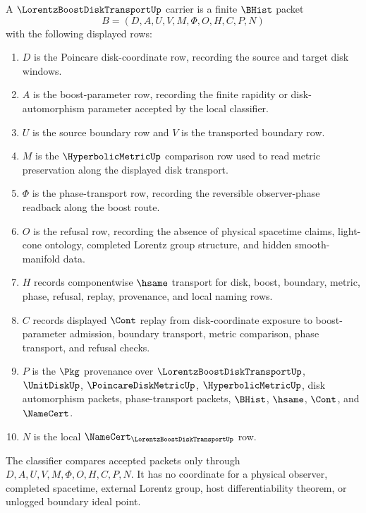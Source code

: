 \begin{definition}
\label{def:lorentz-boost-disk-transport-carrier}
A $\LorentzBoostDiskTransportUp$ carrier is a finite $\BHist$ packet
$$
B=(D,A,U,V,M,\Phi,O,H,C,P,N)
$$
with the following displayed rows:
\begin{enumerate}
\item $D$ is the Poincare disk-coordinate row, recording the source and target disk windows.
\item $A$ is the boost-parameter row, recording the finite rapidity or disk-automorphism parameter accepted by the local classifier.
\item $U$ is the source boundary row and $V$ is the transported boundary row.
\item $M$ is the $\HyperbolicMetricUp$ comparison row used to read metric preservation along the displayed disk transport.
\item $\Phi$ is the phase-transport row, recording the reversible observer-phase readback along the boost route.
\item $O$ is the refusal row, recording the absence of physical spacetime claims, light-cone ontology, completed Lorentz group structure, and hidden smooth-manifold data.
\item $H$ records componentwise $\hsame$ transport for disk, boost, boundary, metric, phase, refusal, replay, provenance, and local naming rows.
\item $C$ records displayed $\Cont$ replay from disk-coordinate exposure to boost-parameter admission, boundary transport, metric comparison, phase transport, and refusal checks.
\item $P$ is the $\Pkg$ provenance over $\LorentzBoostDiskTransportUp$, $\UnitDiskUp$, $\PoincareDiskMetricUp$, $\HyperbolicMetricUp$, disk automorphism packets, phase-transport packets, $\BHist$, $\hsame$, $\Cont$, and $\NameCert$.
\item $N$ is the local $\NameCert_{\LorentzBoostDiskTransportUp}$ row.
\end{enumerate}
The classifier compares accepted packets only through $D,A,U,V,M,\Phi,O,H,C,P,N$. It has no coordinate for a physical observer, completed spacetime, external Lorentz group, host differentiability theorem, or unlogged boundary ideal point.
\end{definition}

